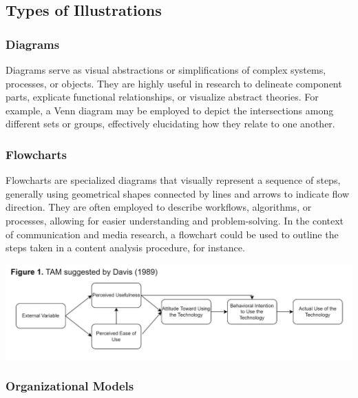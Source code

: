 \documentclass[
  b5paper]{book}
\begin{document}
\hypertarget{types-of-illustrations}{%
\subsection*{Types of Illustrations}\label{types-of-illustrations}}

\hypertarget{diagrams}{%
\subsubsection*{Diagrams}\label{diagrams}}

Diagrams serve as visual abstractions or simplifications of complex systems, processes, or objects. They are highly useful in research to delineate component parts, explicate functional relationships, or visualize abstract theories. For example, a Venn diagram may be employed to depict the intersections among different sets or groups, effectively elucidating how they relate to one another.

\hypertarget{flowcharts}{%
\subsubsection*{Flowcharts}\label{flowcharts}}

Flowcharts are specialized diagrams that visually represent a sequence of steps, generally using geometrical shapes connected by lines and arrows to indicate flow direction. They are often employed to describe workflows, algorithms, or processes, allowing for easier understanding and problem-solving. In the context of communication and media research, a flowchart could be used to outline the steps taken in a content analysis procedure, for instance.

\includegraphics{images/model.png}

\hypertarget{organizational-models}{%
\subsubsection*{Organizational Models}\label{organizational-models}}
\end{document}
